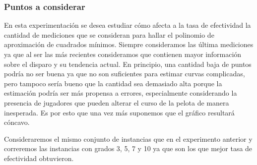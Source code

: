 \subsubsection{Puntos a considerar}
En esta experimentación se desea estudiar cómo afecta a la tasa de efectividad la cantidad de mediciones que se consideran para 
hallar el polinomio de aproximación de cuadrados mínimos. Siempre consideramos las última mediciones ya que al ser las más recientes
consideramos que contienen mayor información sobre el disparo y su tendencia actual. En principio, una cantidad baja de puntos podría no ser 
buena ya que no son suficientes para estimar curvas complicadas, pero tampoco sería bueno que la cantidad sea demasiado alta porque la 
estimación podría ser más propensa a errores, especialmente considerando la presencia de jugadores que pueden alterar el curso de la 
pelota de manera inesperada. Es por esto que una vez más suponemos que el gráfico resultará cóncavo.
\par
Consideraremos el mismo conjunto de instancias que en el experimento anterior y correremos las instancias con grados 3, 5, 7 y 10 ya que son los
que mejor tasa de efectividad obtuvieron.




